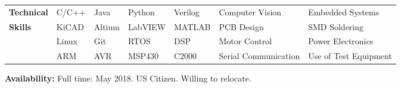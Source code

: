 \documentclass[11pt]{article}
\begin{document}

\vspace{0.75em}
\begin{tabular}{@{}l l l l l l l}
    \textbf{Technical} & C/C++ & Java & Python & Verilog & Computer Vision & Embedded Systems \\
    \textbf{Skills}    & KiCAD & Altium & LabVIEW & MATLAB & PCB Design & SMD Soldering \\
                       & Linux & Git & RTOS & DSP & Motor Control & Power Electronics \\
                       & ARM & AVR & MSP430 & C2000 & Serial Communication & Use of Test Equipment\\
\end{tabular}

\vspace{0.75em}
\textbf{Availability:} Full time: May 2018. US Citizen. Willing to relocate.
\end{document}
